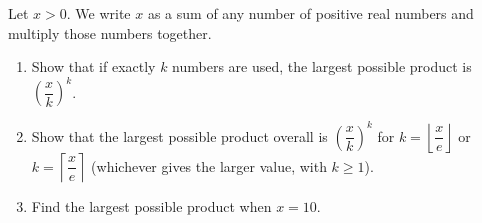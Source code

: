 Let $x>0$. We write $x$ as a sum of any number of positive real numbers and multiply those numbers together.
\begin{enumerate}
\item[(a)] Show that if exactly $k$ numbers are used, the largest possible product is $\left(\dfrac {x}{k}\right)^k$.
\item[(b)] Show that the largest possible product overall is $\left(\dfrac {x}{k}\right)^k$ for $k=\left\lfloor \dfrac {x}{e}\right\rfloor$ or $k=\left\lceil\dfrac {x}{e}\right\rceil$ (whichever gives the larger value, with $k\ge1$).
\item[(c)] Find the largest possible product when $x=10$.
\end{enumerate}
